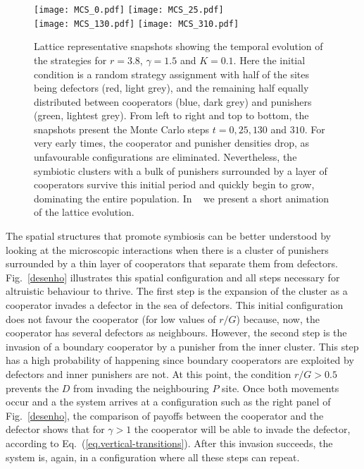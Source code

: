 \documentclass[5p]{elsarticle}
\begin{document}
\begin{figure}[t]
\begin{center}
\texttt{[image: MCS\_0.pdf]}
\texttt{[image: MCS\_25.pdf]} \\
\vspace{0.1cm} 
\hspace{0.05cm} 
\texttt{[image: MCS\_130.pdf]}
\texttt{[image: MCS\_310.pdf]}
\caption{Lattice representative snapshots showing the temporal evolution of the strategies for $r = 3.8$, $\gamma=1.5$ {and $K=0.1$}. Here the initial condition is a random strategy assignment with half of the sites being defectors (red, light grey), and the remaining half equally distributed between cooperators (blue, dark grey) and  punishers (green, lightest grey). From left to right and top to bottom, the snapshots present the Monte Carlo steps $t=0, 25, 130$ and $310$. For very early times, the cooperator and punisher densities drop, as unfavourable configurations are eliminated. Nevertheless, the symbiotic clusters with a bulk of punishers surrounded by a layer of cooperators survive this initial period and quickly begin to grow, dominating the entire population. In ~\cite{gif_fig4} we present a short animation of the lattice evolution.}
\label{figtimeevo2}
\end{center}
\end{figure}

The spatial structures that promote symbiosis can be better understood by looking at the microscopic interactions when there is a cluster of punishers surrounded by a thin layer of cooperators that separate them from defectors. Fig.~\ref{desenho} illustrates this spatial configuration and all steps necessary for altruistic behaviour to thrive.
The first step is the expansion of the cluster as a cooperator invades a defector in the sea of defectors. This initial configuration does not favour the cooperator (for low values of $r/G$) because, now, the cooperator has several defectors as neighbours. However, the second step is the invasion of a boundary cooperator by a punisher from the inner cluster. This step has a high probability of happening since boundary cooperators are exploited by defectors and inner punishers are not. 
%
At this point, the condition $r/G > 0.5$ prevents the $D$ from invading the neighbouring $P$ site.
%
Once both movements occur and a {the system arrives at a } configuration such as the right panel of Fig.~\ref{desenho}, the comparison of payoffs between the cooperator and the defector shows that for $\gamma>1$ the cooperator will be able to invade the defector, {according to}  Eq.~(\ref{eq.vertical-transitions}). After this invasion succeeds, the system is, again, in a configuration where all these steps can repeat. 
\end{document}
